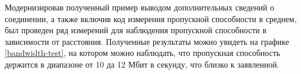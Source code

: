 
Модернизировав полученный пример выводом дополнительных сведений
о соединении, а также включив код измерения пропускной
способности в среднем, был проведен ряд измерений для
наблюдения пропускной способности в зависимости от расстояния.
Полученные результаты можно увидеть на графике \ref{bandwidth-test},
на котором можно наблюдать, что пропускная способность держится
в диапазоне от 10 да 12 Мбит в секунду, что близко к заявленной.


